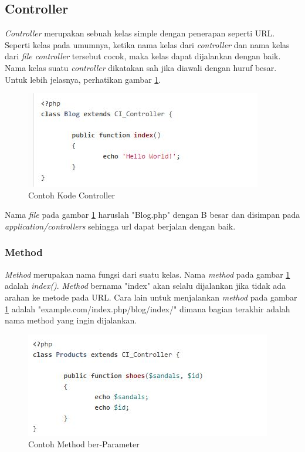 	\subsection{Controller}
	\label{sub: controller}
	
		\textit{Controller} merupakan sebuah kelas simple dengan penerapan seperti URL. Seperti kelas pada umumnya, ketika nama kelas dari \textit{controller} dan nama kelas dari \textit{file controller} tersebut cocok, maka kelas dapat dijalankan dengan baik. Nama kelas suatu \textit{controller} dikatakan sah jika diawali dengan huruf besar. Untuk lebih jelasnya, perhatikan gambar \ref{fig:controller}.
		
			\begin{figure}[H]
				\centering
				\includegraphics[scale=1]{Gambar/controller}
				\caption{Contoh Kode Controller}
				\label{fig:controller}
			\end{figure}
	
		Nama \textit{file} pada gambar \ref{fig:controller} haruslah  "Blog.php" dengan B besar dan disimpan pada \textit{application/controllers} sehingga url dapat berjalan dengan baik.
		
	\subsubsection{Method}
	\label{subsub: method}
	
		\textit{Method} merupakan nama fungsi dari suatu kelas. Nama \textit{method} pada gambar \ref{fig:controller} adalah \textit{index()}. \textit{Method} bernama "index" akan selalu dijalankan jika tidak ada arahan ke metode pada URL. Cara lain untuk menjalankan \textit{method} pada gambar \ref{fig:controller} adalah "example.com/index.php/blog/index/" dimana bagian terakhir adalah nama method yang ingin dijalankan.
		
		
		\begin{figure}[H]
			\centering
			\includegraphics[scale=1]{Gambar/methode}
			\caption{Contoh Method ber-Parameter}
			\label{fig:method}
		\end{figure}
		
